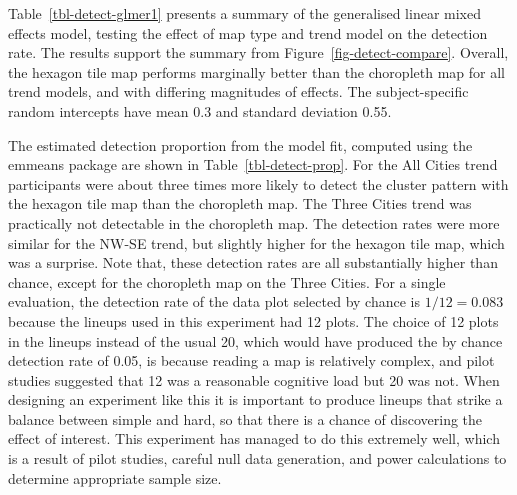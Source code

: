 \documentclass[
doublespace,
  times]{anzsauth}
\begin{document}
\begin{table}

\caption{\label{tbl-detect-prop}Model estimates for the proportion of
detection in each of the trend models (standard error). Note that
selecting the data plot by chance would produce a detection rate of
0.083, for each lineup.}


\end{table}%

Table~\ref{tbl-detect-glmer1} presents a summary of the generalised
linear mixed effects model, testing the effect of map type and trend
model on the detection rate. The results support the summary from
Figure~\ref{fig-detect-compare}. Overall, the hexagon tile map performs
marginally better than the choropleth map for all trend models, and with
differing magnitudes of effects. The subject-specific random intercepts
have mean 0.3 and standard deviation 0.55.

The estimated detection proportion from the model fit, computed using
the \textsf{emmeans} package \citep{Lenth2025} are shown in
Table~\ref{tbl-detect-prop}. For the All Cities trend participants were
about three times more likely to detect the cluster pattern with the
hexagon tile map than the choropleth map. The Three Cities trend was
practically not detectable in the choropleth map. The detection rates
were more similar for the NW-SE trend, but slightly higher for the
hexagon tile map, which was a surprise. Note that, these detection rates
are all substantially higher than chance, except for the choropleth map
on the Three Cities. For a single evaluation, the detection rate of the
data plot selected by chance is \(1/12=0.083\) because the lineups used
in this experiment had 12 plots. The choice of 12 plots in the lineups
instead of the usual 20, which would have produced the by chance
detection rate of 0.05, is because reading a map is relatively complex,
and pilot studies suggested that 12 was a reasonable cognitive load but
20 was not. When designing an experiment like this it is important to
produce lineups that strike a balance between simple and hard, so that
there is a chance of discovering the effect of interest. This experiment
has managed to do this extremely well, which is a result of pilot
studies, careful null data generation, and power calculations to
determine appropriate sample size.
\end{document}
